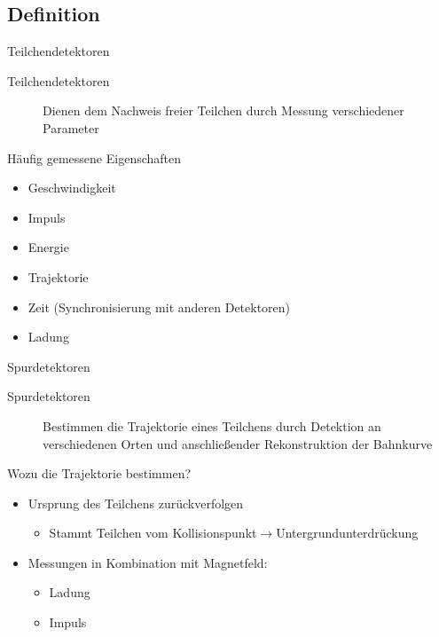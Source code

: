 
\subsection{Definition}

\begin{frame}{Teilchendetektoren}
	\begin{description}
	  \item[Teilchendetektoren] Dienen dem Nachweis freier Teilchen durch Messung
	  verschiedener Parameter
	\end{description}
	
	\begin{block}{Häufig gemessene Eigenschaften}
		\begin{itemize}\setlength{\itemsep}{+5pt}
		  \item Geschwindigkeit
		  \item Impuls
		  \item Energie
		  \item Trajektorie
		  \item Zeit (Synchronisierung mit anderen Detektoren)
		  \item Ladung
		\end{itemize}
	\end{block}
\end{frame}


	\begin{frame}{Spurdetektoren}
	\begin{description}
	  \item[Spurdetektoren] Bestimmen die Trajektorie eines Teilchens durch
	  Detektion an verschiedenen Orten und anschließender Rekonstruktion der
	  Bahnkurve
	\end{description}
	\begin{block}{Wozu die Trajektorie bestimmen?}
		\begin{itemize}\setlength{\itemsep}{+5pt}
		  \item Ursprung des Teilchens zurückverfolgen
		  	\begin{itemize}\setlength{\itemsep}{+5pt}
		    	\item Stammt Teilchen vom
		    	Kollisionspunkt$\rightarrow$Untergrundunterdrückung
		  	\end{itemize}
		  \item Messungen in Kombination mit Magnetfeld:
		   	\begin{itemize}\setlength{\itemsep}{+5pt}
		    	\item Ladung
		    	\item Impuls
		  	\end{itemize}
		\end{itemize}
	\end{block}
\end{frame}

